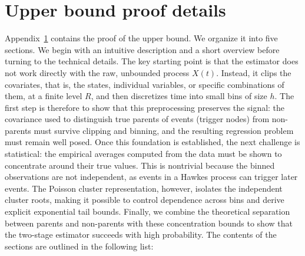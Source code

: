 \documentclass{article}
\begin{document}
\section{Upper bound proof details}
\label{app:upper_bound}
Appendix~\ref{app:upper_bound} contains the proof of the upper bound. 
We organize it into five sections.
We begin with an intuitive description and a short overview before turning to the technical details. The key starting point is that the estimator does not work directly with the raw, unbounded process $X(t)$. Instead, it clips the covariates, that is, the states, individual variables, or specific combinations of them, at a finite level $R$, and then discretizes time into small bins of size $h$. The first step is therefore to show that this preprocessing preserves the signal: the covariance used to distinguish true parents of events (trigger nodes) from non-parents must survive clipping and binning, and the resulting regression problem must remain well posed. Once this foundation is established, the next challenge is statistical: the empirical averages computed from the data must be shown to concentrate around their true values. This is nontrivial because the binned observations are not independent, as events in a Hawkes process can trigger later events. The Poisson cluster representation, however, isolates the independent cluster roots, making it possible to control dependence across bins and derive explicit exponential tail bounds. Finally, we combine the theoretical separation between parents and non-parents with these concentration bounds to show that the two-stage estimator succeeds with high probability. The contents of the sections are outlined in the following list:
\end{document}
